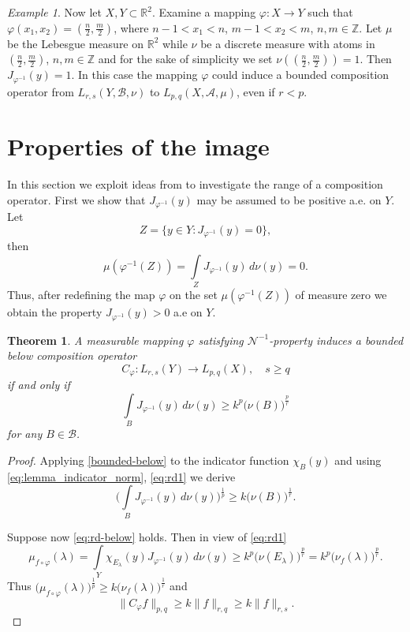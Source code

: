 \documentclass{birkjour}
\newtheorem{thm}{Theorem}[section]
\theoremstyle{definition}
\theoremstyle{remark}
\newtheorem*{ex}{Example}
\numberwithin{equation}{section}
\begin{document}
\begin{ex}
Now let $X,Y\subset\mathbb R^2$. 
Examine a mapping $\varphi:X\to Y$ such that $\varphi(x_1,x_2) = (\frac{n}{2}, \frac{m}{2})$,
where $n-1<x_1<n$, $m-1<x_2<m$, $n,m\in \mathbb Z$. 
Let $\mu$ be the Lebesgue measure on $\mathbb R^2$ while $\nu$ be a discrete measure with atoms in 
$(\frac{n}{2}, \frac{m}{2})$, $n,m\in \mathbb Z$ and for the sake of simplicity
we set $\nu((\frac{n}{2}, \frac{m}{2})) = 1$. 
Then $J_{\varphi^{-1}}(y)=1$.
In this case the mapping $\varphi$ could induce a bounded composition operator
from $L_{r,s}(Y, \mathcal B, \nu)$ to $L_{p,q}(X, \mathcal A, \mu)$, even if $r<p$.
\end{ex}


\section{Properties of the image}\label{image}
In this section we exploit ideas from \cite{ADV} to investigate the  range of a composition operator.  
First we show that $J_{\varphi^{-1}}(y)$ may be assumed to be positive a.e. on $Y$.
Let $$Z=\{y\in Y : J_{\varphi^{-1}}(y)=0\},$$ then 
$$\mu(\varphi^{-1}(Z)) = \int\limits_Z J_{\varphi^{-1}}(y)\, d\nu(y) = 0.$$
Thus, after redefining the map  $\varphi$ on the set $\mu(\varphi^{-1}(Z))$ of measure zero
we obtain the property $J_{\varphi^{-1}}(y)>0$ a.e on $Y$.

\begin{thm}\label{theorem:bounded_ below}
A measurable mapping $\varphi$ satisfying $\mathcal N^{-1}$-property 
induces a bounded below composition operator 
$$
C_\varphi:L_{r,s}(Y)\to L_{p,q}(X), \quad s\geq q
$$
if and only if
\begin{equation}\label{eq:rd-below}
\int\limits_BJ_{\varphi^{-1}}(y)\, d\nu(y) \geq k^p\big(\nu(B)\big)^{\frac{p}{r}}
\end{equation}
for any $B\in \mathcal B$.
\end{thm}
\begin{proof}
Applying \eqref{bounded-below} to the indicator function $\chi_B(y)$ and using \eqref{eq:lemma_indicator_norm},
\eqref{eq:rd1} we derive
$$
\bigg(\int\limits_BJ_{\varphi^{-1}}(y)\, d\nu(y)\bigg)^{\frac{1}{p}} \geq k\big(\nu(B)\big)^{\frac{1}{r}}.
$$ 

Suppose now \eqref{eq:rd-below} holds.
Then in view of \eqref{eq:rd1}
$$
\mu_{f\circ\varphi}(\lambda) = \int\limits_Y\chi_{E_\lambda}(y) J_{\varphi^{-1}}(y)\, d\nu(y)
\geq k^p\big(\nu(E_\lambda)\big)^{\frac{p}{r}} = k^p\big(\nu_f(\lambda)\big)^{\frac{p}{r}}.
$$
Thus $\big(\mu_{f\circ\varphi}(\lambda)\big)^{\frac{1}{p}}\geq k\big(\nu_f(\lambda)\big)^{\frac{1}{r}}$ and
$$
\|C_\varphi f\|_{p,q} \geq k\|f\|_{r,q} \geq k\|f\|_{r,s}.
$$
\end{proof}
\end{document}
